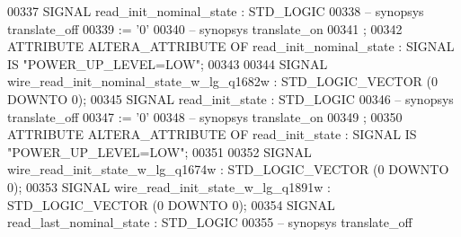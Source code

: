 \begin{DoxyCode}
{00337      \textcolor{keywordflow}{SIGNAL}  \textcolor{vhdlchar}{read_init_nominal_state}    \textcolor{vhdlchar}{:}   \textcolor{comment}{STD\_LOGIC}
00338 \textcolor{keyword}{     -- synopsys translate\_off}
00339       \textcolor{vhdlchar}{:=} \textcolor{vhdlchar}{'}\textcolor{vhdllogic}{}\textcolor{vhdllogic}{0}\textcolor{vhdlchar}{'}
00340 \textcolor{keyword}{     -- synopsys translate\_on}
00341      ;
00342      \textcolor{keywordflow}{ATTRIBUTE} \textcolor{vhdlchar}{ALTERA_ATTRIBUTE} \textcolor{keywordflow}{OF} \textcolor{vhdlchar}{read_init_nominal_state} \textcolor{vhdlchar}{:} \textcolor{keywordflow}{SIGNAL} \textcolor{keywordflow}{IS} \textcolor{keyword}{"POWER\_UP\_LEVEL=LOW"};
00343 
00344      \textcolor{keywordflow}{SIGNAL}  \textcolor{vhdlchar}{wire_read_init_nominal_state_w_lg_q1682w}   \textcolor{vhdlchar}{:}   \textcolor{comment}{STD\_LOGIC\_VECTOR} \textcolor{vhdlchar}{(}\textcolor{vhdllogic}{}\textcolor{vhdllogic}{0} \textcolor{keywordflow}{DOWNTO} \textcolor{vhdllogic}{}\textcolor{vhdllogic}{0}\textcolor{vhdlchar}{)};
00345      \textcolor{keywordflow}{SIGNAL}  \textcolor{vhdlchar}{read_init_state}    \textcolor{vhdlchar}{:}   \textcolor{comment}{STD\_LOGIC}
00346 \textcolor{keyword}{     -- synopsys translate\_off}
00347       \textcolor{vhdlchar}{:=} \textcolor{vhdlchar}{'}\textcolor{vhdllogic}{}\textcolor{vhdllogic}{0}\textcolor{vhdlchar}{'}
00348 \textcolor{keyword}{     -- synopsys translate\_on}
00349      ;
00350      \textcolor{keywordflow}{ATTRIBUTE} \textcolor{vhdlchar}{ALTERA_ATTRIBUTE} \textcolor{keywordflow}{OF} \textcolor{vhdlchar}{read_init_state} \textcolor{vhdlchar}{:} \textcolor{keywordflow}{SIGNAL} \textcolor{keywordflow}{IS} \textcolor{keyword}{"POWER\_UP\_LEVEL=LOW"};
00351 
00352      \textcolor{keywordflow}{SIGNAL}  \textcolor{vhdlchar}{wire_read_init_state_w_lg_q1674w}   \textcolor{vhdlchar}{:}   \textcolor{comment}{STD\_LOGIC\_VECTOR} \textcolor{vhdlchar}{(}\textcolor{vhdllogic}{}\textcolor{vhdllogic}{0} \textcolor{keywordflow}{DOWNTO} \textcolor{vhdllogic}{}\textcolor{vhdllogic}{0}\textcolor{vhdlchar}{)};
00353      \textcolor{keywordflow}{SIGNAL}  \textcolor{vhdlchar}{wire_read_init_state_w_lg_q1891w}   \textcolor{vhdlchar}{:}   \textcolor{comment}{STD\_LOGIC\_VECTOR} \textcolor{vhdlchar}{(}\textcolor{vhdllogic}{}\textcolor{vhdllogic}{0} \textcolor{keywordflow}{DOWNTO} \textcolor{vhdllogic}{}\textcolor{vhdllogic}{0}\textcolor{vhdlchar}{)};
00354      \textcolor{keywordflow}{SIGNAL}  \textcolor{vhdlchar}{read_last_nominal_state}    \textcolor{vhdlchar}{:}   \textcolor{comment}{STD\_LOGIC}
00355 \textcolor{keyword}{     -- synopsys translate\_off}
}
\end{DoxyCode}
